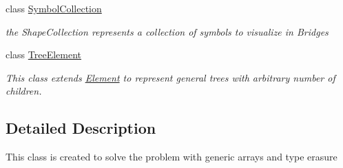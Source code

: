\begin{DoxyCompactItemize}
class \hyperlink{classbridges_1_1base_1_1_symbol_collection}{Symbol\+Collection}
\begin{DoxyCompactList}\small\item\em the Shape\+Collection represents a collection of symbols to visualize in Bridges \end{DoxyCompactList}\item 
class \hyperlink{classbridges_1_1base_1_1_tree_element}{Tree\+Element}
\begin{DoxyCompactList}\small\item\em This class extends \hyperlink{classbridges_1_1base_1_1_element}{Element} to represent general trees with arbitrary number of children. \end{DoxyCompactList}\end{DoxyCompactItemize}


\subsection{Detailed Description}
This class is created to solve the problem with generic arrays and type erasure 